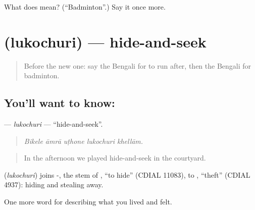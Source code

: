 \begin{tcolorbox}[breakable,colback=teal!4,colframe=teal!35!black,title={Before you move on}]
What does  mean? (\textquotedblleft{}Badminton\textquotedblright{}.) Say it once more.
\end{tcolorbox}
\section[\texorpdfstring{\bn{লুকোচুরি} (lukochuri)}{লুকোচুরি (lukochuri)}]{ (lukochuri) — hide-and-seek}

\label{lesson:BN-C517-lukochuri}



\begin{quote}
Before the new one: say the Bengali for to run after, then the Bengali for badminton.
\end{quote}

\subsection*{You'll want to know: }
\textbf{} — \emph{lukochuri} — \textquotedblleft{}hide-and-seek\textquotedblright{}.

\begin{quote}
    
\end{quote}

\begin{quote}
\emph{Bikele āmrā uṭhone lukochuri khellām.}
\end{quote}

\begin{quote}
In the afternoon we played hide-and-seek in the courtyard.
\end{quote}

\begin{cousinweb}
\textbf{} (\emph{lukochuri}) joins -, the stem of , \textquotedblleft{}to hide\textquotedblright{} (CDIAL 11083), to , \textquotedblleft{}theft\textquotedblright{} (CDIAL 4937): hiding and stealing away.
\end{cousinweb}

\begin{grammarlens}[title={What you've built}]
One more word for describing what you lived and felt.
\end{grammarlens}

